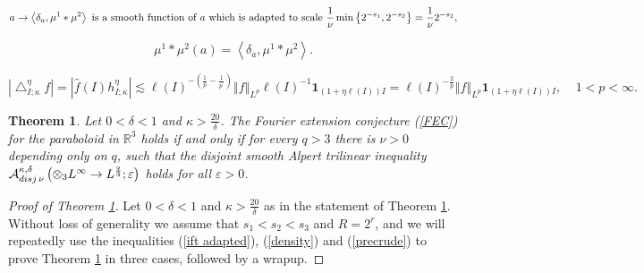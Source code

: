 \documentclass[10pt,a4paper]{amsart}
\newtheorem{theorem}{Theorem}
\begin{document}
\begin{equation}
a\rightarrow\left\langle \delta_{a},\mu^{1}\ast\mu^{2}\right\rangle \text{ is
a smooth function of }a\text{ which is \emph{adapted to scale }}\frac{1}{\nu
}\min\left\{  2^{-s_{1}},2^{-s_{2}}\right\}  =\frac{1}{\nu}2^{-s_{2}%
},\label{ift adapted}%
\end{equation}

\begin{equation}
\mu^{1}\ast\mu^{2}\left(  a\right)  =\left\langle \delta_{a},\mu^{1}\ast
\mu^{2}\right\rangle .\label{density}%
\end{equation}

\begin{equation}
\left\vert \bigtriangleup_{I;\kappa}^{\eta}f\right\vert =\left\vert
\widehat{f}\left(  I\right)  h_{I;\kappa}^{\eta}\right\vert \lesssim
\ell\left(  I\right)  ^{-\left(  \frac{1}{p}-\frac{1}{p^{\prime}}\right)
}\left\Vert f\right\Vert _{L^{p}}\ell\left(  I\right)  ^{-1}\mathbf{1}%
_{\left(  1+\eta\ell\left(  I\right)  \right)  I}=\ell\left(  I\right)
^{-\frac{2}{p}}\left\Vert f\right\Vert _{L^{p}}\mathbf{1}_{\left(  1+\eta
\ell\left(  I\right)  \right)  I},\ \ \ \ \ 1<p<\infty.\label{precrude}%
\end{equation}

\begin{theorem}
\label{main Alpert}Let $0<\delta<1$ and $\kappa>\frac{20}{\delta}$. The
Fourier extension conjecture (\ref{FEC}) for the paraboloid in $\mathbb{R}%
^{3}$ holds \emph{if and only if} for every $q>3$ there is $\nu>0$ depending
only on $q$, such that the disjoint \emph{smooth Alpert }trilinear inequality
$\mathcal{A}_{\mathop{\rm disj}\nu}^{\kappa,\delta}\left(  \otimes
_{3}L^{\infty}\rightarrow L^{\frac{q}{3}};\varepsilon\right)  $ holds for all
$\varepsilon>0$.
\end{theorem}

\begin{proof}
[Proof of Theorem \ref{main Alpert}]Let $0<\delta<1$ and $\kappa>\frac
{20}{\delta}$ as in the statement of Theorem \ref{main Alpert}. Without loss
of generality we assume that $s_{1}<s_{2}<s_{3}$ and $R=2^{r}$, and we will
repeatedly use the inequalities (\ref{ift adapted}), (\ref{density}) and
(\ref{precrude}) to prove Theorem \ref{main Alpert} in three cases, followed
by a wrapup.
\end{proof}
\end{document}
